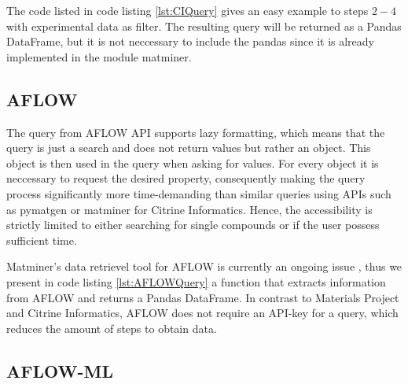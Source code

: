 The code listed in code listing \ref{lst:CIQuery} gives an easy example to steps $2-4$ with experimental data as filter. The resulting query will be returned as a Pandas DataFrame, but it is not neccessary to include the pandas since it is already implemented in the module matminer.



\subsection{AFLOW}

The query from AFLOW API \cite{Curtarolo2012} supports lazy formatting, which means that the query is just a search and does not return values but rather an object. This object is then used in the query when asking for values. For every object it is neccessary to request the desired property, consequently making the query process significantly more time-demanding than similar queries using APIs such as pymatgen or matminer for Citrine Informatics. Hence, the accessibility is strictly limited to either searching for single compounds or if the user possess sufficient time.

Matminer's data retrievel tool for AFLOW is currently an ongoing issue \cite{Rosenbrock2017}, thus we present in code listing \ref{lst:AFLOWQuery} a function that extracts information from AFLOW and returns a Pandas DataFrame. In contrast to Materials Project and Citrine Informatics, AFLOW does not require an API-key for a query, which reduces the amount of steps to obtain data.



\subsection{AFLOW-ML}

